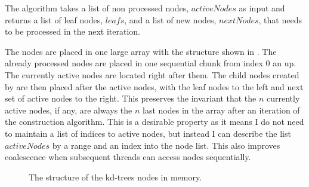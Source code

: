 \begin{algorithm}
\begin{algorithmic}
{                 \STATE{}

                   \ENDFOR
                 \ENDFOR
  }
  \end{algorithmic}
\end{algorithm}


The algorithm takes a list of non processed nodes, $activeNodes$ as
input and returns a list of leaf nodes, $leafs$, and a list of new
nodes, $nextNodes$, that needs to be processed in the next iteration.


The nodes are placed in one large array with the structure shown in
. The already processed nodes are placed in
one sequential chunk from index 0 an up. The currently active nodes
are located right after them. The child nodes created by
 are then placed after the active
nodes, with the leaf nodes to the left and next set of active nodes to
the right. This preserves the invariant that the $n$ currently active
nodes, if any, are always the $n$ last nodes in the array after an
iteration of the construction algorithm. This is a desirable property
as it means I do not need to maintain a list of indices to active
nodes, but instead I can describe the list $activeNodes$ by a range
and an index into the node list. This also improves coalescence when
subsequent threads can access nodes sequentially.


\begin{figure}
  \centering
  \caption{The structure of the kd-trees nodes in memory.}
  \label{fig:nodeStructure}
\end{figure}

